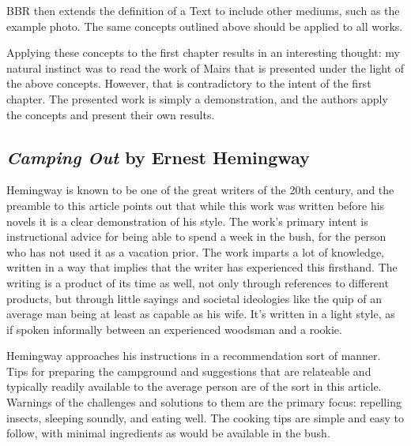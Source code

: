 \documentclass[journal.tex]{subfiles}
\begin{document}
BBR then extends the definition of a Text to include other mediums, such as the example photo.
The same concepts outlined above should be applied to all works. 

Applying these concepts to the first chapter results in an interesting thought: my natural instinct was to read the work of Mairs that is presented under the light of the above concepts.
However, that is contradictory to the intent of the first chapter.
The presented work is simply a demonstration, and the authors apply the concepts and present their own results.


\subsection*{\textit{Camping Out} by Ernest Hemingway}

Hemingway is known to be one of the great writers of the 20th century, and the preamble to this article points out that while this work was written before his novels it is a clear demonstration of his style.
The work's primary intent is instructional advice for being able to spend a week in the bush, for the person who has not used it as a vacation prior.
The work imparts a lot of knowledge, written in a way that implies that the writer has experienced this firsthand.
The writing is a product of its time as well, not only through references to different products, but through little sayings and societal ideologies like the quip of an average man being at least as capable as his wife.
It's written in a light style, as if spoken informally between an experienced woodsman and a rookie. 

Hemingway approaches his instructions in a recommendation sort of manner. 
Tips for preparing the campground and suggestions that are relateable and typically readily available to the average person are of the sort in this article.
Warnings of the challenges and solutions to them are the primary focus: repelling insects, sleeping soundly, and eating well.
The cooking tips are simple and easy to follow, with minimal ingredients as would be available in the bush.
\end{document}
